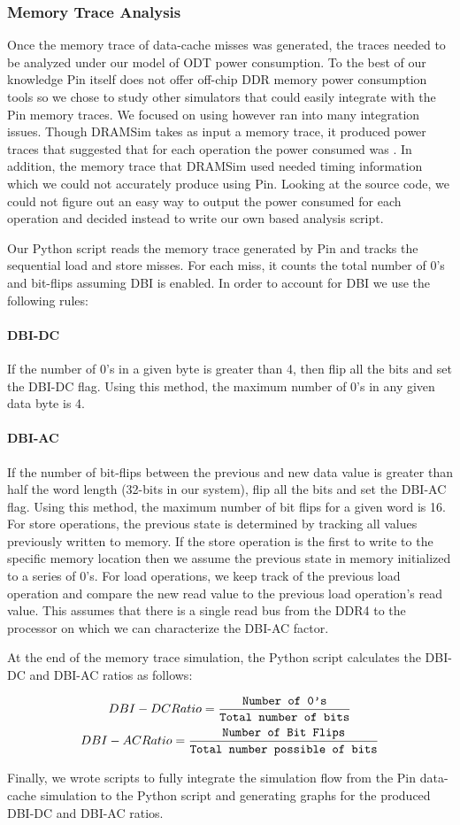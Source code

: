 \subsubsection{Memory Trace Analysis}
Once the memory trace of data-cache misses was generated, the traces needed to
be analyzed under our model of ODT power consumption. To the best of our
knowledge Pin itself does not offer off-chip DDR memory power consumption tools
so we chose to study other simulators that could easily integrate with the Pin
memory traces. We focused on using  \cite{dram-sim} however ran
into many integration issues. Though DRAMSim takes as input a memory trace, it
produced power traces that suggested that for each operation the power consumed
was . In addition, the memory trace that DRAMSim used needed timing
information which we could not accurately produce using Pin. Looking at the
source code, we could not figure out an easy way to output the power consumed
for each operation and decided instead to write our own  based
analysis script.

Our Python script reads the memory trace generated by Pin and tracks the
sequential load and store misses. For each miss, it counts the total number
of $0$'s and bit-flips assuming DBI is enabled. In order to account for DBI we
use the following rules:

\paragraph{DBI-DC} If the number of $0$'s in a given byte is greater than 4,
then flip all the bits and set the DBI-DC flag. Using this method, the maximum
number of $0$'s in any given data byte is 4.

\paragraph{DBI-AC} If the number of bit-flips between the previous and new data
value is greater than half the word length (32-bits in our system), flip all
the bits and set the DBI-AC flag. Using this method, the maximum number of bit
flips for a given word is 16. For store operations, the previous state is
determined by tracking all values previously written to memory. If the store
operation is the first to write to the specific memory location then we assume
the previous state in memory initialized to a series of $0$'s. For load
operations, we keep track of the previous load operation and compare the new
read value to the previous load operation's read value. This assumes that there
is a single read bus from the DDR4 to the processor on which we can
characterize the DBI-AC factor.

At the end of the memory trace simulation, the Python script calculates the
DBI-DC and DBI-AC ratios as follows:

$$DBI-DC Ratio = \frac{\texttt{Number of 0's}}{\texttt{Total number of bits}}$$
$$DBI-AC Ratio = \frac{\texttt{Number of Bit Flips}}{\texttt{Total number possible of bits}}$$

Finally, we wrote  scripts to fully integrate the simulation flow from
the Pin data-cache simulation to the Python script and generating graphs for
the produced DBI-DC and DBI-AC ratios.
